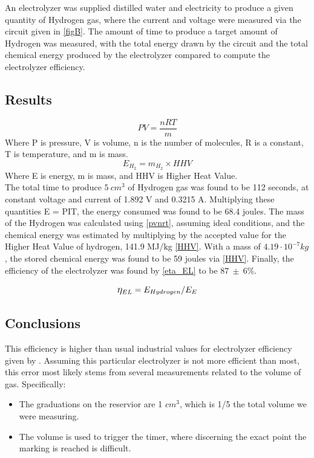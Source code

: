 \documentclass[aps,prl,reprint]{revtex4-2}
\begin{document}
An electrolyzer was supplied distilled water and electricity to produce a
given quantity of Hydrogen gas, where the current and voltage were measured
via the circuit given in \ref{figB}. The amount of time to produce a 
target amount of Hydrogen was measured, with the total energy drawn by the 
circuit and the total chemical energy produced by the electrolyzer compared
to compute the electrolyzer efficiency.

\subsection{Results}

\begin{equation}
PV = \frac{nRT}{m}
    \label{pvnrt}
\end{equation}
Where P is pressure, V is volume, n is the number of molecules, R is a constant, T is temperature, and m is mass.\\

\begin{equation}
	E_{H_2} = m_{H_2} \times HHV
    \label{HHV}
\end{equation}
Where E is energy, m is mass, and HHV is Higher Heat Value. \\

The total time to produce $5\ cm^3$ of Hydrogen gas was found to be 112
seconds, at constant voltage and current of 1.892 V and 0.3215 A. Multiplying
these quantities E = PIT, the energy consumed was found to be 68.4 joules. 
The mass of the Hydrogen was calculated using \ref{pvnrt}, assuming ideal
conditions, and the chemical energy was estimated by multiplying by the accepted
value for the Higher Heat Value of hydrogen, 141.9 MJ/kg \ref{HHV}. With a mass
of $ 4.19 \cdot 10^{-7} kg$, the stored chemical energy was found to be 59 
joules via \ref{HHV}. Finally, the efficiency of the electrolyzer was found by
\ref{eta_EL} to be $87\ \pm\ 6\%$. 

\begin{equation}
    \mathlarger{\eta}_{EL}=E_{Hydrogen}/E_E
    \label{eta_EL}
\end{equation}

\subsection{Conclusions}

This efficiency is higher than usual industrial values for electrolyzer 
efficiency given by \cite{Electrolyzer}. Assuming this particular electrolyzer
is not more efficient than most, this error most likely stems from several
measurements related to the volume of gas. Specifically:
\begin{itemize}
	\item 
		The graduations on the reservior are 1 $cm^3$, which is 1/5 the 
		total volume we were measuring.
	\item 
		The volume is used to trigger the timer, where discerning the 
		exact point the marking is reached is difficult.
\end{itemize}
\end{document}
